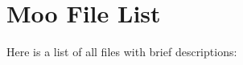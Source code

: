 \section{Moo File List}
Here is a list of all files with brief descriptions:\begin{CompactList}
\item{}
\end{CompactList}
